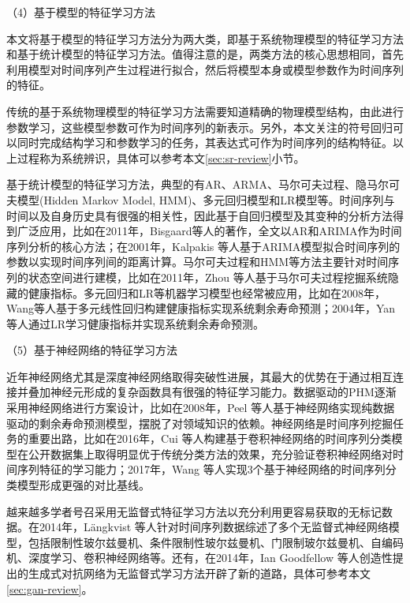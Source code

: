 （4）基于模型的特征学习方法

本文将基于模型的特征学习方法分为两大类，即基于系统物理模型的特征学习方法\cite{bongard2007automated}和基于统计模型的特征学习方法\cite{esling2012time}。值得注意的是，两类方法的核心思想相同，首先利用模型对时间序列产生过程进行拟合，然后将模型本身或模型参数作为时间序列的特征。

传统的基于系统物理模型的特征学习方法需要知道精确的物理模型结构，由此进行参数学习，这些模型参数可作为时间序列的新表示。另外，本文关注的符号回归可以同时完成结构学习和参数学习的任务，其表达式可作为时间序列的结构特征。以上过程称为系统辨识\cite{bongard2007automated}\cite{nelles2002nonlinear}，具体可以参考本文\ref{sec:sr-review}小节。

基于统计模型的特征学习方法，典型的有AR、ARMA、马尔可夫过程、隐马尔可夫模型(Hidden Markov Model, HMM)、多元回归模型和LR模型等。时间序列与时间以及自身历史具有很强的相关性，因此基于自回归模型及其变种的分析方法得到广泛应用，比如在2011年，Bisgaard等人的著作，全文以AR和ARIMA作为时间序列分析的核心方法\cite{bisgaard2011time}；在2001年，Kalpakis 等人基于ARIMA模型拟合时间序列的参数以实现时间序列间的距离计算\cite{kalpakis2001distance}。马尔可夫过程和HMM等方法主要针对时间序列的状态空间进行建模，比如在2011年，Zhou 等人基于马尔可夫过程挖掘系统隐藏的健康指标\cite{zhou2011latent}。多元回归和LR等机器学习模型也经常被应用，比如在2008年，Wang等人基于多元线性回归构建健康指标实现系统剩余寿命预测\cite{wang2008similarity}；2004年，Yan 等人通过LR学习健康指标并实现系统剩余寿命预测\cite{yan2004prognostic}。

（5）基于神经网络的特征学习方法


近年神经网络尤其是深度神经网络取得突破性进展，其最大的优势在于通过相互连接并叠加神经元形成的复杂函数具有很强的特征学习能力\cite{lecun2015deep}。数据驱动的PHM逐渐采用神经网络进行方案设计\cite{tsui2015prognostics}，比如在2008年，Peel 等人基于神经网络实现纯数据驱动的剩余寿命预测模型，摆脱了对领域知识的依赖\cite{peel2008data}。神经网络是时间序列挖掘任务的重要出路\cite{langkvist2014review}，比如在2016年，Cui 等人构建基于卷积神经网络的时间序列分类模型在公开数据集上取得明显优于传统分类方法的效果\cite{cui2016multi}，充分验证卷积神经网络对时间序列特征的学习能力；2017年，Wang 等人实现3个基于神经网络的时间序列分类模型形成更强的对比基线\cite{wang2017time}。

越来越多学者号召采用无监督式特征学习方法以充分利用更容易获取的无标记数据。在2014年，L{\"a}ngkvist 等人针对时间序列数据综述了多个无监督式神经网络模型，包括限制性玻尔兹曼机、条件限制性玻尔兹曼机、门限制玻尔兹曼机、自编码机、深度学习、卷积神经网络等\cite{langkvist2014review}。还有，在2014年，Ian Goodfellow 等人创造性提出的生成式对抗网络为无监督式学习方法开辟了新的道路\cite{goodfellow2014generative}，具体可参考本文\ref{sec:gan-review}。

